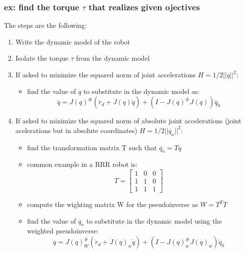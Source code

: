 \documentclass[a4paper,12pt]{article}
\begin{document}
\subsubsection{ex: find the torque $\tau$ that realizes given ojectives}
The steps are the following:
\begin{enumerate}
    \item Write the dynamic model of the robot
    \item Isolate the torque $\tau$ from the dynamic model
    \item If asked to minimize the squared norm of 
    joint accelerations $H=1/2||\ddot{q}||^2$:
    \begin{itemize}
    \item find the value of $\ddot{q}$ to substitute 
    in the dynamic model as: \begin{equation}
    \ddot{q} = J(q)^{\#}(\ddot{r}_d + \dot{J}(q)\dot{q})+ (I-J(q)^{\#}J(q))\ddot{q}_0
    \end{equation}
    \end{itemize}
    \item If asked to minimize the squared norm of 
    absolute joint accelerations (joint acelerations but in absolute 
    coordinates) $H=1/2||\ddot{q_a}||^2$:
    \begin{itemize}
        \item find the transformation matrix T such that 
        $\ddot{q_a}=T\ddot{q}$
        \item common example in a RRR robot is: \begin{equation}
        T = \begin{bmatrix}
            1 & 0 & 0 \\
            1 & 1 & 0 \\
            1 & 1 & 1
        \end{bmatrix}
        \end{equation}
        \item compute the wighting matrix W for the pseudoinverse 
        as $W=T^TT$
        \item find the value of $\ddot{q_a}$ to substitute 
        in the dynamic model using the weighted pseudoinverse:
        \begin{equation}
            \ddot{q} = J(q)_W^{\#}(\ddot{r}_d + \dot{J}(q)_w\dot{q})+ (I-J(q)^{\#}_wJ(q)_w)\ddot{q}_0
            \end{equation}
            

\end{itemize}
\end{enumerate}
\end{document}
